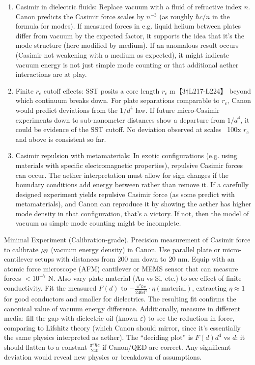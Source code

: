 \documentclass[11pt]{article}
\begin{document}
\begin{enumerate}

\item 
Casimir in dielectric fluids: Replace vacuum with a fluid of refractive index $n$. Canon predicts the Casimir force scales by $n^{-3}$ (as roughly $\hbar c/n$ in the formula for modes). If measured forces in e.g. liquid helium between plates differ from vacuum by the expected factor, it supports the idea that it’s the mode structure (here modified by medium). If an anomalous result occurs (Casimir not weakening with a medium as expected), it might indicate vacuum energy is not just simple mode counting or that additional aether interactions are at play.




\item 
Finite $r_c$ cutoff effects: SST posits a core length $r_c $ m【3†L217-L224】 beyond which continuum breaks down. For plate separations comparable to $r_c$, Canon would predict deviations from the $1/d^4$ law. If future micro-Casimir experiments down to sub-nanometer distances show a departure from $1/d^4$, it could be evidence of the SST cutoff. No deviation observed at scales ~100x $r_c$ and above is consistent so far.




\item 
Casimir repulsion with metamaterials: In exotic configurations (e.g. using materials with specific electromagnetic properties), repulsive Casimir forces can occur. The aether interpretation must allow for sign changes if the boundary conditions add energy between rather than remove it. If a carefully designed experiment yields repulsive Casimir force (as some predict with metamaterials), and Canon can reproduce it by showing the aether has higher mode density in that configuration, that’s a victory. If not, then the model of vacuum as simple mode counting might be incomplete.




\end{enumerate}

Minimal Experiment (Calibration-grade). Precision measurement of Casimir force to calibrate $\rho_{\!E}$ (vacuum energy density) in Canon. Use parallel plate or micro-cantilever setups with distances from 200 nm down to 20 nm. Equip with an atomic force microscope (AFM) cantilever or MEMS sensor that can measure forces $<10^{-7}$ N. Also vary plate material (Au vs Si, etc.) to see effect of finite conductivity. Fit the measured $F(d)$ to $-\frac{\pi^2 \hbar c}{240 d^4} \cdot \eta(\text{material})$, extracting $\eta\approx1$ for good conductors and smaller for dielectrics. The resulting fit confirms the canonical value of vacuum energy difference. Additionally, measure in different media: fill the gap with dielectric oil (known $\varepsilon$) to see the reduction in force, comparing to Lifshitz theory (which Canon should mirror, since it’s essentially the same physics interpreted as aether). The “deciding plot” is $F(d) d^4$ vs $d$: it should flatten to a constant $\frac{\pi^2 \hbar c}{240}$ if Canon/QED are correct. Any significant deviation would reveal new physics or breakdown of assumptions.
\end{document}
